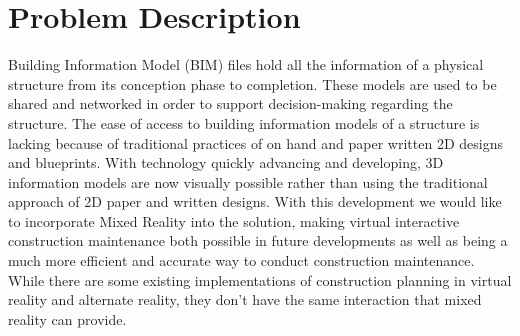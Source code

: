 \documentclass[onecolumn, draftclsnofoot,10pt, compsoc]{IEEEtran}
\begin{document}
\clearpage

\section{Problem Description}
Building Information Model (BIM) files hold all the information of a physical structure from its conception phase to completion. These models are used to be shared and networked in order to support decision-making regarding the structure. The ease of access to building information models of a structure is lacking because of traditional practices of on hand and paper written 2D designs and blueprints. With technology quickly advancing and developing, 3D information models are now visually possible rather than using the traditional approach of 2D paper and written designs. With this development we would like to incorporate Mixed Reality into the solution, making virtual interactive construction maintenance both possible in future developments as well as being a much more efficient and accurate way to conduct construction maintenance. While there are some existing implementations of construction planning in virtual reality and alternate reality, they don't have the same interaction that mixed reality can provide.

\end{document}
